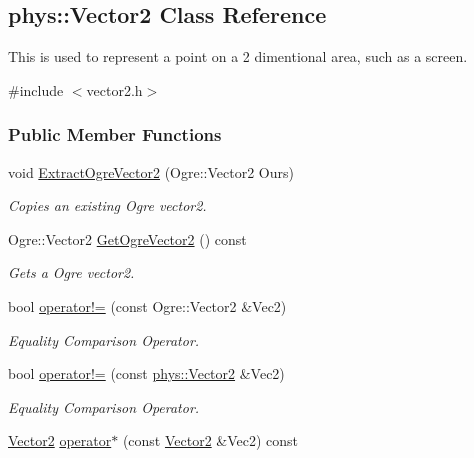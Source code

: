 \hypertarget{classphys_1_1Vector2}{
\subsection{phys::Vector2 Class Reference}
\label{classphys_1_1Vector2}
}


This is used to represent a point on a 2 dimentional area, such as a screen.  




{\ttfamily \#include $<$vector2.h$>$}

\subsubsection*{Public Member Functions}
\begin{DoxyCompactItemize}
\item 
void \hyperlink{classphys_1_1Vector2_af12824b786ce4b91443b5dbd700dfd58}{ExtractOgreVector2} (Ogre::Vector2 Ours)
\begin{DoxyCompactList}\small\item\em Copies an existing Ogre vector2. \item\end{DoxyCompactList}\item 
Ogre::Vector2 \hyperlink{classphys_1_1Vector2_adc6efedbdfdca596b719decc87ee2e4b}{GetOgreVector2} () const 
\begin{DoxyCompactList}\small\item\em Gets a Ogre vector2. \item\end{DoxyCompactList}\item 
bool \hyperlink{classphys_1_1Vector2_a186c1da597e1471a9ee5b07cc8bb9fb8}{operator!=} (const Ogre::Vector2 \&Vec2)
\begin{DoxyCompactList}\small\item\em Equality Comparison Operator. \item\end{DoxyCompactList}\item 
bool \hyperlink{classphys_1_1Vector2_a074ca2a4d54925f745dbb9effd5c7e19}{operator!=} (const \hyperlink{classphys_1_1Vector2}{phys::Vector2} \&Vec2)
\begin{DoxyCompactList}\small\item\em Equality Comparison Operator. \item\end{DoxyCompactList}\item 
\hyperlink{classphys_1_1Vector2}{Vector2} \hyperlink{classphys_1_1Vector2_a6a253bb2507b9254a102c0793bf0f215}{operator$\ast$} (const \hyperlink{classphys_1_1Vector2}{Vector2} \&Vec2) const 

\end{DoxyCompactItemize}
